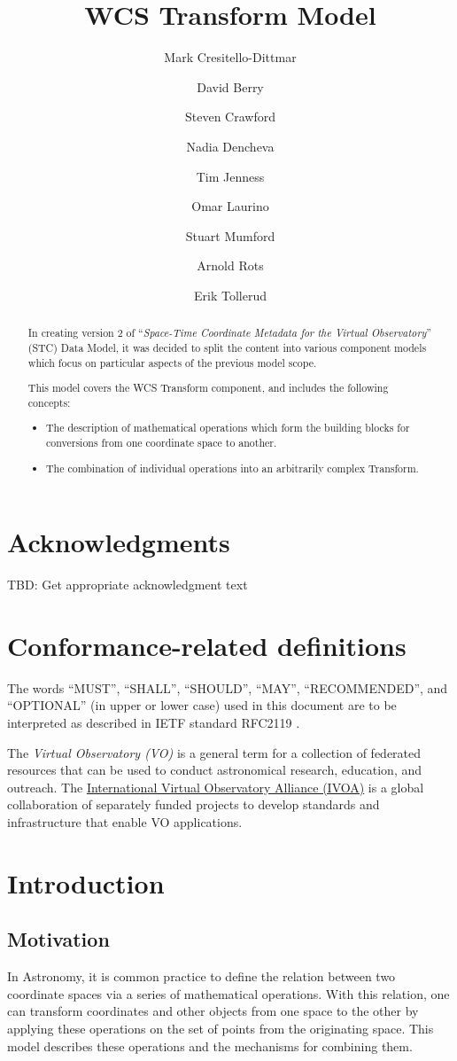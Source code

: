 \documentclass[11pt,a4paper]{ivoa}
\title{WCS Transform Model}
\author{Mark Cresitello-Dittmar}
\author{David Berry}
\author{Steven Crawford}
\author{Nadia Dencheva}
\author{Tim Jenness}
\author{Omar Laurino}
\author{Stuart Mumford}
\author{Arnold Rots}
\author{Erik Tollerud}
\begin{document}
\begin{abstract}
  In creating version 2 of ``\emph{Space-Time Coordinate Metadata for the Virtual Observatory}'' (STC) \citep{std:STC} Data Model, it was decided to split the content into various component models which focus on particular aspects of the previous model scope.  
  
  This model covers the WCS Transform component, and includes the following concepts:
  \begin{itemize}
  \item The description of mathematical operations which form the building blocks for conversions from one coordinate space to another.
  \item The combination of individual operations into an arbitrarily complex Transform.
  \end{itemize}
\end{abstract}

\section*{Acknowledgments}
TBD: Get appropriate acknowledgment text

\section*{Conformance-related definitions}

The words ``MUST'', ``SHALL'', ``SHOULD'', ``MAY'', ``RECOMMENDED'', and
``OPTIONAL'' (in upper or lower case) used in this document are to be
interpreted as described in IETF standard RFC2119 \citep{std:RFC2119}.

The \emph{Virtual Observatory (VO)} is a
general term for a collection of federated resources that can be used
to conduct astronomical research, education, and outreach.
The \href{http://www.ivoa.net}{International
Virtual Observatory Alliance (IVOA)} is a global
collaboration of separately funded projects to develop standards and
infrastructure that enable VO applications.

\section{Introduction}

\subsection{Motivation}
In Astronomy, it is common practice to define the relation between two coordinate spaces via a series of mathematical operations.  
With this relation, one can transform coordinates and other objects from one space to the other by applying these operations on
the set of points from the originating space.  This model describes these operations and the mechanisms for combining them.
\end{document}

